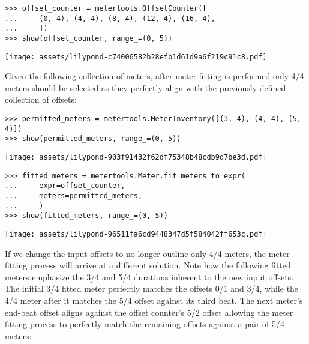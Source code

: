 \begin{abjadbookoutput}
\begin{singlespacing}
\vspace{-0.5\baselineskip}
\begin{lstlisting}
>>> offset_counter = metertools.OffsetCounter([
...     (0, 4), (4, 4), (8, 4), (12, 4), (16, 4),
...     ])
>>> show(offset_counter, range_=(0, 5))
\end{lstlisting}
\noindent\texttt{[image: assets/lilypond-c74006582b28efb1d61d9a6f219c91c8.pdf]}
\end{singlespacing}
\end{abjadbookoutput}

\noindent Given the following collection of meters, after meter fitting is
performed only 4/4 meters should be selected as they perfectly align with
the previously defined collection of offsets:

\begin{comment}
<abjad>
permitted_meters = metertools.MeterInventory([(3, 4), (4, 4), (5, 4)])
show(permitted_meters, range_=(0, 5))
fitted_meters = metertools.Meter.fit_meters_to_expr(
    expr=offset_counter,
    meters=permitted_meters,
    )
show(fitted_meters, range_=(0, 5))
</abjad>
\end{comment}

\begin{abjadbookoutput}
\begin{singlespacing}
\vspace{-0.5\baselineskip}
\begin{lstlisting}
>>> permitted_meters = metertools.MeterInventory([(3, 4), (4, 4), (5, 4)])
>>> show(permitted_meters, range_=(0, 5))
\end{lstlisting}
\noindent\texttt{[image: assets/lilypond-903f91432f62df75348b48cdb9d7be3d.pdf]}
\begin{lstlisting}
>>> fitted_meters = metertools.Meter.fit_meters_to_expr(
...     expr=offset_counter,
...     meters=permitted_meters,
...     )
>>> show(fitted_meters, range_=(0, 5))
\end{lstlisting}
\noindent\texttt{[image: assets/lilypond-96511fa6cd9448347d5f584042ff653c.pdf]}
\end{singlespacing}
\end{abjadbookoutput}

\noindent If we change the input offsets to no longer outline only 4/4 meters,
the meter fitting process will arrive at a different solution. Note how the
following fitted meters emphasize the 3/4 and 5/4 durations inherent to the new
input offsets. The initial 3/4 fitted meter perfectly matches the offsets 0/1
and 3/4, while the 4/4 meter after it matches the 5/4 offset against its
third beat. The next meter's end-beat offset aligns against the offset
counter's 5/2 offset allowing the meter fitting process to perfectly match the
remaining offsets against a pair of 5/4 meters:

